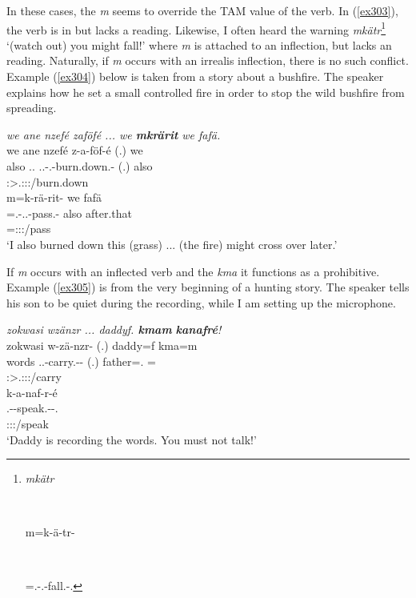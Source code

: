 In these cases, the  \emph{m} seems to override the TAM value of the verb. In (\ref{ex303}), the verb is in  but lacks a  reading. Likewise, I often heard the warning \emph{mkätr}\footnote{\parbox{0.02cm}{\hfill}\parbox{6cm}{\emph{mkätr}}\\ \parbox{0.1cm}{\hfill}\parbox{6cm}{m=k-ä-tr-\Zero}\\ \parbox{0.1cm}{\hfill}\parbox{6cm}{\Appr=\M.\Bet-\Vc.\Ndu-fall.\Rs-\Ssg.\Imp{}}} `(watch out) you might fall!' where \emph{m} is attached to an  inflection, but lacks an  reading. Naturally, if \emph{m} occurs with an irrealis inflection, there is no such conflict. Example (\ref{ex304}) below is taken from a story about a bushfire. The speaker explains how he set a small controlled fire in order to stop the wild bushfire from spreading.

\begin{exe}
	\ex \emph{we ane nzefé zaföfé ... we \textbf{mkrärit} we fafä.}\\
	\glll we ane nzefé z-a-föf-é (.) we\\
	also \Dem{} \Fsg.\Erg.\Emph{} \Tsg.\F.\Gam-\Vc.\Ndu-burn.down.\Rs-\Fsg{} (.) also\\
	{} {} {} \footnotesize{\Fsg:\Sbj>\Tsg.\F:\Obj:\Rpst:\Pfv/burn.down} {} {}\\
	\sn
	\glll m=k-rä-rit-\Zero{} we fafä\\
	\Appr=\M.\Bet-\Irr.\Vc.\Ndu-pass.\Rs-\Stsg{} also after.that\\
	\footnotesize{\Appr=\Stsg:\Sbj:\Irr:\Pfv/pass} {} {}\\
	\trans `I also burned down this (grass) ... (the fire) might cross over later.'\\ 
	\label{ex304}
\end{exe}

If \emph{m} occurs with an  inflected verb and the  \emph{kma} it functions as a prohibitive. Example (\ref{ex305}) is from the very beginning of a hunting story. The speaker tells his son to be quiet during the recording, while I am setting up the microphone.

\begin{exe}
	\ex \emph{zokwasi wzänzr ... daddyf. \textbf{kmam} \textbf{kanafré}!}\\
	\glll zokwasi w-zä-nzr-\Zero{} (.) daddy=f kma=m\\
	words \Tsg.\F.\Alph-carry.\Ext-\Ndu-\Stsg{} (.) father=\Erg.\Sg{} \Pot=\Appr{}\\
	{} \footnotesize{\Stsg:\Sbj>\Tsg.\F:\Obj:\Nonpast:\Ipfv/carry} {} {} {}\\
	\sn
	\glll k-a-naf-r-é\\
	\M.\Bet-\Vc-speak.\Ext-\Ndu-\Ssg.\Imp\\
	\footnotesize{\Ssg:\Sbj:\Imp:\Ipfv/speak}\\
	\trans `Daddy is recording the words. You must not talk!' 
	\label{ex305}
\end{exe}

